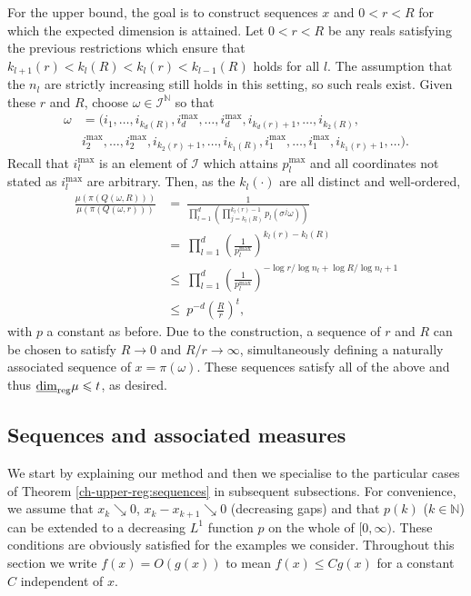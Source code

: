 For the upper bound, the goal is to construct sequences $x$ and $0 < r < R$ for which the expected dimension is attained. Let $0<r<R$ be any reals satisfying the previous restrictions which ensure that $ k_{l+1}(r)< k_l(R) < k_l(r) < k_{l-1}(R)$ holds for all $l$. The assumption that the $n_l$ are strictly increasing still holds in this setting, so such reals exist. Given these $r$ and $R$, choose $\omega \in \mathcal{I}^\mathbb{N}$ so that 
\begin{align*} 
\omega&= (i_1,\ldots, i_{k_d(R)}, i_d^{\text{max}},\ldots, i_d^{\text{max}}, i_{k_d(r)+1},\ldots, i_{k_2(R)},\\
&i_2^{\text{max}},\ldots , i_2^{\text{max}}, i_{k_2(r)+1},\ldots, i_{k_1(R)}, i_1^{\text{max}}, \ldots, i_1^{\text{max}}, i_{k_1(r)+1},\ldots).
\end{align*}
Recall that $i_l^{\text{max}}$ is an element of $\mathcal{I}$ which attains $p_l^{\text{max}}$ and all coordinates not stated as $i_l^{\text{max}}$ are arbitrary. Then, as the $k_l(\cdot)$ are all distinct and well-ordered,
\begin{align*}
\frac{\mu(\pi(Q(\omega,R)))}{\mu(\pi(Q(\omega,r)))}  & =\ \frac{1}{\prod_{l=1}^d\left(\prod_{j=k_l(R)}^{k_l(r)-1}p_l(\sigma^j \omega) \right)} \\
& = \ \prod_{l=1}^d\left( \frac{1}{p_l^{\text{max}}}\right)^{k_l(r)-k_l(R)}  \\
& \le\ \prod_{l=1}^d \left( \frac{1}{p_l^{\text{max}}}\right)^{-\log r/\log n_l + \log R/\log n_l + 1}  \\
& \le \ p^{-d} \left( \frac{R}{r} \right)^{t},
\end{align*}
with $p$ a constant as before. Due to the construction, a sequence of $r$ and $R$ can be chosen to satisfy $R \rightarrow 0$ and $R/r \rightarrow \infty$, simultaneously defining a naturally associated sequence of $x = \pi(\omega)$. These sequences satisfy all of the above and thus $\underline{\dim}_{\textup{reg}} \mu \leqslant t$, as desired.




\subsection{Sequences and associated measures}\label{ch-upper-reg:sequenceproof}



We start by explaining our method and then we specialise to the particular cases of  Theorem \ref{ch-upper-reg:sequences} in subsequent subsections.  For convenience, we assume that $x_k \searrow 0$, $x_k-x_{k+1} \searrow 0$ (decreasing gaps) and that $p(k)$ ($k \in \mathbb{N}$) can be extended to a decreasing $L^1$ function $p$ on the whole of $[0,\infty)$.  These conditions are obviously satisfied for the  examples we consider.  Throughout this section we write $f(x)=O(g(x))$ to mean $f(x) \le Cg(x)$ for a constant $C$ independent of $x$.

